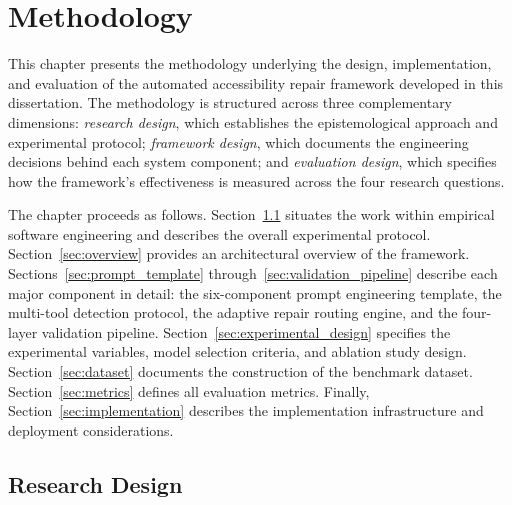 %

\chapter{Methodology}
\label{chap:methodology}

This chapter presents the methodology underlying the design, implementation,
and evaluation of the automated accessibility repair framework developed in
this dissertation.  The methodology is structured across three complementary
dimensions: \emph{research design}, which establishes the epistemological
approach and experimental protocol; \emph{framework design}, which documents
the engineering decisions behind each system component; and \emph{evaluation
design}, which specifies how the framework's effectiveness is measured across
the four research questions.

The chapter proceeds as follows.  Section~\ref{sec:research_design} situates
the work within empirical software engineering and describes the overall
experimental protocol.  Section~\ref{sec:overview} provides an architectural
overview of the framework.  Sections~\ref{sec:prompt_template}
through~\ref{sec:validation_pipeline} describe each major component in detail:
the six-component prompt engineering template, the multi-tool detection
protocol, the adaptive repair routing engine, and the four-layer validation
pipeline.  Section~\ref{sec:experimental_design} specifies the experimental
variables, model selection criteria, and ablation study design.
Section~\ref{sec:dataset} documents the construction of the benchmark dataset.
Section~\ref{sec:metrics} defines all evaluation metrics.  Finally,
Section~\ref{sec:implementation} describes the implementation infrastructure
and deployment considerations.

\section{Research Design}
\label{sec:research_design}

